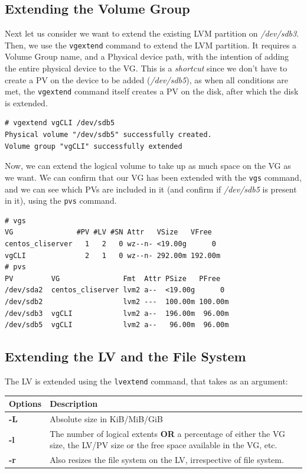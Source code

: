 \subsection{Extending the Volume Group}
Next let us consider we want to extend the existing LVM partition on \textit{/dev/sdb3}. Then, we use the \verb|vgextend| command to extend the LVM partition. It requires a Volume Group name, and a Physical device path, with the intention of adding the entire physical device to the VG. This is a \textit{shortcut} since we don't have to create a PV on the device to be added (\textit{/dev/sdb5}), as when all conditions are met, the \verb|vgextend| command itself creates a PV on the disk, after which the disk is extended. 

\vspace{-15pt}
\begin{verbatim}
# vgextend vgCLI /dev/sdb5
Physical volume "/dev/sdb5" successfully created.
Volume group "vgCLI" successfully extended
\end{verbatim}
\vspace{-10pt}

\noindent
Now, we can extend the logical volume to take up as much space on the VG as we want. We can confirm that our VG has been extended with the \verb|vgs| command, and we can see which PVs are included in it (and confirm if \textit{/dev/sdb5} is present in it), using the \verb|pvs| command. 

\vspace{-15pt}
\begin{verbatim}
# vgs
VG               #PV #LV #SN Attr   VSize   VFree  
centos_cliserver   1   2   0 wz--n- <19.00g      0 
vgCLI              2   1   0 wz--n- 292.00m 192.00m
# pvs
PV         VG               Fmt  Attr PSize   PFree  
/dev/sda2  centos_cliserver lvm2 a--  <19.00g      0 
/dev/sdb2                   lvm2 ---  100.00m 100.00m
/dev/sdb3  vgCLI            lvm2 a--  196.00m  96.00m
/dev/sdb5  vgCLI            lvm2 a--   96.00m  96.00m
\end{verbatim}
\vspace{-10pt}

\subsection{Extending the LV and the File System}
The LV is extended using the \verb|lvextend| command, that takes as an argument:

\vspace{-10pt}
\noindent
\begin{tabular}{lM{0.85}}
	\toprule
	\textbf{Options} &\textbf{Description} \\
	\midrule
	\textbf{-L}	&Absolute size in KiB/MiB/GiB \\
	\textbf{-l}	&The number of logical extents \textbf{OR} a percentage of either the VG size, the LV/PV size or the free space available in the VG, etc. \\
	\midrule
	\textbf{-r}	&Also resizes the file system on the LV, irrespective of file system. \\
	\bottomrule
\end{tabular}

